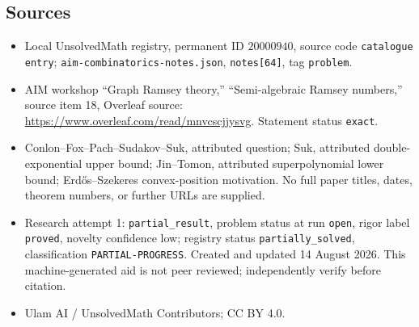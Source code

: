 \documentclass[11pt]{article}
\begin{document}
\subsection{Sources}
\begin{itemize}
\item Local UnsolvedMath registry, permanent ID \(20000940\), source code \texttt{catalogue entry}; \texttt{aim-combinatorics-notes.json}, \texttt{notes[64]}, tag \texttt{problem}.
\item AIM workshop ``Graph Ramsey theory,'' ``Semi-algebraic Ramsey numbers,'' source item 18, Overleaf source: \url{https://www.overleaf.com/read/mnvcscjjysvg}. Statement status \texttt{exact}.
\item Conlon--Fox--Pach--Sudakov--Suk, attributed question; Suk, attributed double-exponential upper bound; Jin--Tomon, attributed superpolynomial lower bound; Erd\H{o}s--Szekeres convex-position motivation. No full paper titles, dates, theorem numbers, or further URLs are supplied.
\item Research attempt 1: \texttt{partial\_result}, problem status at run \texttt{open}, rigor label \texttt{proved}, novelty confidence low; registry status \texttt{partially\_solved}, classification \texttt{PARTIAL-PROGRESS}. Created and updated 14 August 2026. This machine-generated aid is not peer reviewed; independently verify before citation.
\item Ulam AI / UnsolvedMath Contributors; CC BY 4.0.
\end{itemize}
\end{document}
